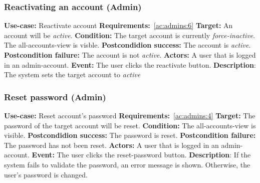 \subsubsection{Reactivating an account (Admin)}\label{subsubsec:reactivate-acc-admin}
\textbf{Use-case:} Reactivate account \newline
\textbf{Requirements:}~\ref{ac:admins:6} \newline
\textbf{Target:} An account will be \textit{active}. \newline
\textbf{Condition:} The target account is currently \textit{force-inactive}.
The all-accounts-view is visble. \newline
\textbf{Postcondidion success:} The account is \textit{active}. \newline
\textbf{Postcondition failure:} The account is not \textit{active}. \newline
\textbf{Actors:} A user that is logged in an admin-account. \newline
\textbf{Event:} The user clicks the reactivate button. \newline
\textbf{Description}: The system sets the target account to \textit{active}

\subsubsection{Reset password (Admin)}\label{subsubsec:reset-pass}
\textbf{Use-case:} Reset account's password \newline
\textbf{Requirements:}~\ref{ac:admins:4} \newline
\textbf{Target:} The password of the target account will be reset. \newline
\textbf{Condition:} The all-accounts-view is visible. \newline
\textbf{Postcondidion success:} The password is reset. \newline
\textbf{Postcondition failure:} The password has not been reset. \newline
\textbf{Actors:} A user that is logged in an admin-account. \newline
\textbf{Event:} The user clicks the reset-password button. \newline
\textbf{Description}: If the system fails to validate the password, an error message is shown.
Otherwise, the user's password is changed.

